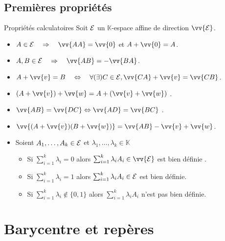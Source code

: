 \documentclass[
bigger]{m53beamer}
\begin{document}
\subsection{Premières propriétés}
  \begin{frame}{Propriétés calculatoires}
    Soit $\mathcal{E}$ un $\mathbb{K}$-espace affine de direction $\vv{\ens{E}}$.
    \begin{itemize}[<+(1)->]
      \item $A \in \ens{E} \quad\Rightarrow\quad \vv{AA}=\vv{0}$ et $A+\vv{0}=A$.
      \item $A,B \in \ens{E} \quad\Rightarrow\quad \vv{AB}=-\vv{BA}$.
      \item $A+\vv{v}=B  \quad\Leftrightarrow\quad \forall (\exists) C \in \ens{E}, \vv{CA}+\vv{v}=\vv{CB}$.
      \item $(A+\vv{v})+\vv{w}=A+(\vv{v}+\vv{w})$ .
      \item $\vv{AB}=\vv{DC} \Leftrightarrow \vv{AD}=\vv{BC}$ .
      \item $\vv{(A+\vv{v})(B+\vv{w})}=\vv{AB}-\vv{v}+\vv{w}$.
      \item Soient $A_{1},\ldots,A_{k} \in \mathcal{E}$ et $\lambda_{1},\ldots,\lambda_{k} \in \mathbb{K}$
        \begin{itemize}[<+(1)->]
          \item Si $\sum_{i=1}^{k}\lambda_{i}=0$ alors $\sum_{i=1}^{k}\lambda_{i}A_{i} \in \vv{\ens{E}}$ est bien définie .
          \item Si $\sum_{i=1}^{k}\lambda_{i}=1$ alors $\sum_{i=1}^{k}\lambda_{i}A_{i} \in \mathcal{E}$ est bien définie.
          \item Si $\sum_{i=1}^{k}\lambda_{i}\notin \{0,1\}$ alors $\sum_{i=1}^{k}\lambda_{i}A_{i}$ n'est pas bien définie.
        \end{itemize}\pause
    \end{itemize}
  \end{frame}
\section{Barycentre et repères}
\end{document}
